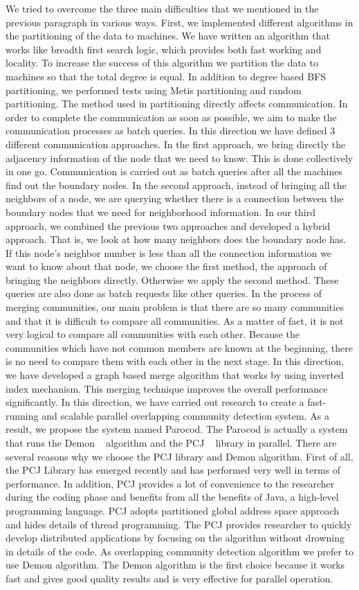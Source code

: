 We tried to overcome the three main difficulties that we mentioned in the previous paragraph in various ways. First, we implemented different algorithms in the partitioning of the data to machines. We have written an algorithm that works like breadth first search logic, which provides both fast working and locality. To increase the success of this algorithm we partition the data to machines so that the total degree is equal. In addition to degree based BFS partitioning, we performed tests using Metis partitioning and random partitioning. The method used in partitioning directly affects communication. In order to complete the communication as soon as possible, we aim to make the communication processes as batch queries. In this direction we have defined 3 different communication approaches. In the first approach, we bring directly the adjacency information of the node that we need to know. This is done collectively in one go. Communication is carried out as batch queries after all the machines find out the boundary nodes. In the second approach, instead of bringing all the neighbors of a node, we are querying whether there is a connection between the boundary nodes that we need for neighborhood information. In our third approach, we combined the previous two approaches and developed a hybrid approach. That is, we look at how many neighbors does the boundary node has. If this node's neighbor number is less than all the connection information we want to know about that node, we choose the first method, the approach of bringing the neighbors directly. Otherwise we apply the second method. These queries are also done as batch requests like other queries. In the process of merging communities, our main problem is that there are so many communities and that it is difficult to compare all communities. As a matter of fact, it is not very logical to compare all communities with each other. Because the communities which have not common members are known at the beginning, there is no need to compare them with each other in the next stage. In this direction, we have developed a graph based merge algorithm that works by using inverted index mechanism. This merging technique improves the overall performance significantly.
In this direction, we have carried out research to create a fast-running and scalable parallel overlapping community detection system. As a result, we propose the system named Parocod. The Parocod is actually a system that runs the Demon ~\cite{ref:Demon} algorithm and the PCJ ~\cite{ref:Pcj} library in parallel. There are several reasons why we choose the PCJ library and Demon algorithm. First of all, the PCJ Library has emerged recently and has performed very well in terms of performance. In addition, PCJ provides a lot of convenience to the researcher during the coding phase and benefits from all the benefits of Java, a high-level programming language. PCJ adopts partitioned global address space approach and hides details of thread programming. The PCJ provides researcher to quickly develop distributed applications by focusing on the algorithm without drowning in details of the code. As overlapping community detection algorithm we prefer to use Demon algorithm. The Demon algorithm is the first choice because it works fast and gives good quality results and is very effective for parallel operation.

